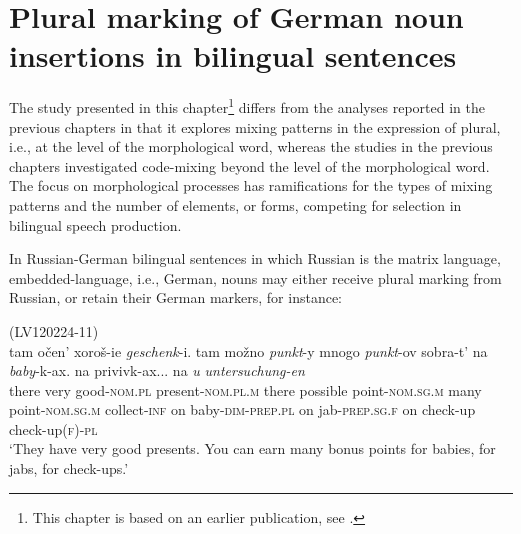 \chapter{Plural marking of German noun insertions in bilingual sentences}\label{PL}

The study presented in this chapter\footnote{This chapter is based on an earlier publication, see \citep{hakimov}.} differs from the analyses reported in the previous chapters in that it explores mixing patterns in the expression of plural, i.e., at the level of the morphological word, whereas the studies in the previous chapters investigated code-mixing beyond the level of the morphological word. The focus on morphological processes has ramifications for the types of mixing patterns and the number of elements, or forms, competing for selection in bilingual speech production.

In Russian-German bilingual sentences in which Russian is the matrix language, embedded-language, i.e., German, nouns may either receive plural marking from Russian, or retain their German markers, for instance:

\ea (LV120224-11)\label{ex:6:1}\\
    \gll tam očen' xoroš-ie \textit{geschenk}-i. tam možno \textit{punkt}-y mnogo \textit{punkt}-ov sobra-t' na \textit{baby}-k-ax. na privivk-ax... na \textit{u} \textit{untersuchung-en}\\
        there very good-\textsc{nom.pl} present-\textsc{nom.pl.m} 
        there possible point-\textsc{nom.sg.m} many point-\textsc{nom.sg.m} collect-\textsc{inf} on baby-\textsc{dim}-\textsc{prep.pl} 
        on jab-\textsc{prep.sg.f} on check-up check-up\textsc{(f)-pl}\\
    \glt ‘They have very good presents. You can earn many bonus points for babies, for jabs, for check-ups.’
\z

